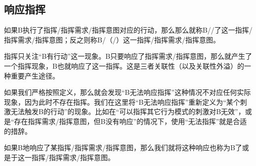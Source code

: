 \subsection{响应指挥}
如果B执行了指挥/指挥需求/指挥意图对应的行动，那么那么就称B//了这一指挥/指挥需求/指挥意图；反之则称B/（/）这一指挥/指挥需求/指挥意图。
\begin{explain}
指挥只关注“B有行动”这一现象。B只要响应了指挥需求/指挥意图，那么就产生了一个指挥现象，B也就响应了这一指挥。这是三者关联性（以及关联性外溢）的一种重要产生途径。

如果我们严格按照定义，那么就会发现“B无法响应指挥”这种情况不对应任何实际现象，因为此时不存在指挥。我们在这里将“B无法响应指挥”重新定义为“某个刺激无法触发B的行动”的现象。比如在“可以指挥其它行为模式的刺激对B无效”，或是“存在指挥需求/指挥意图，但B没有响应”的情况下，使用“无法指挥”就是合适的措辞。
\end{explain}
如果B地响应了某指挥/指挥需求/指挥意图，那么我们就将这种响应也称为B了或是于这一指挥/指挥需求/指挥意图。

